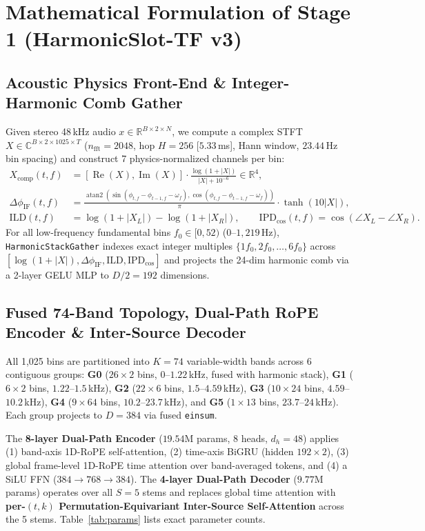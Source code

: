 \documentclass[10pt,a4paper]{article}
\begin{document}
\section{Mathematical Formulation of Stage 1 (HarmonicSlot-TF v3)}
\subsection{Acoustic Physics Front-End \& Integer-Harmonic Comb Gather}
Given stereo 48\,kHz audio $x \in \mathbb{R}^{B \times 2 \times N}$, we compute a complex STFT $X \in \mathbb{C}^{B \times 2 \times 1025 \times T}$ ($n_{\text{fft}}=2048$, hop $H=256$ [$5.33$\,ms], Hann window, $23.44$\,Hz bin spacing) and construct 7 physics-normalized channels per bin:
\begin{align}
    X_{\text{comp}}(t,f) &= [\operatorname{Re}(X), \operatorname{Im}(X)] \cdot \frac{\log(1 + |X|)}{|X| + 10^{-6}} \in \mathbb{R}^{4}, \\
    \Delta\phi_{\text{IF}}(t,f) &= \frac{\operatorname{atan2}(\sin(\phi_{t,f} - \phi_{t-1,f} - \omega_f), \cos(\phi_{t,f} - \phi_{t-1,f} - \omega_f))}{\pi} \cdot \tanh(10|X|), \\
    \text{ILD}(t,f) &= \log(1 + |X_L|) - \log(1 + |X_R|), \qquad \text{IPD}_{\cos}(t,f) = \cos(\angle X_L - \angle X_R).
\end{align}
For all low-frequency fundamental bins $f_0 \in [0, 52)$ ($0$--$1{,}219$\,Hz), \texttt{HarmonicStackGather} indexes exact integer multiples $\{1f_0, 2f_0, \dots, 6f_0\}$ across $[\log(1+|X|), \Delta\phi_{\text{IF}}, \text{ILD}, \text{IPD}_{\cos}]$ and projects the 24-dim harmonic comb via a 2-layer GELU MLP to $D/2=192$ dimensions.

\subsection{Fused 74-Band Topology, Dual-Path RoPE Encoder \& Inter-Source Decoder}
All 1,025 bins are partitioned into $K=74$ variable-width bands across 6 contiguous groups: \textbf{G0} ($26\times 2$ bins, $0$--$1.22$\,kHz, fused with harmonic stack), \textbf{G1} ($6\times 2$ bins, $1.22$--$1.5$\,kHz), \textbf{G2} ($22\times 6$ bins, $1.5$--$4.59$\,kHz), \textbf{G3} ($10\times 24$ bins, $4.59$--$10.2$\,kHz), \textbf{G4} ($9\times 64$ bins, $10.2$--$23.7$\,kHz), and \textbf{G5} ($1\times 13$ bins, $23.7$--$24$\,kHz). Each group projects to $D=384$ via fused \texttt{einsum}.

The \textbf{8-layer Dual-Path Encoder} ($19.54$M params, 8 heads, $d_h=48$) applies (1) band-axis 1D-RoPE self-attention, (2) time-axis BiGRU (hidden $192\times 2$), (3) global frame-level 1D-RoPE time attention over band-averaged tokens, and (4) a SiLU FFN ($384\to 768\to 384$). The \textbf{4-layer Dual-Path Decoder} ($9.77$M params) operates over all $S=5$ stems and replaces global time attention with \textbf{per-$(t,k)$ Permutation-Equivariant Inter-Source Self-Attention} across the 5 stems. Table~\ref{tab:params} lists exact parameter counts.
\end{document}

